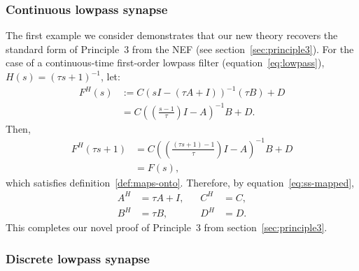 \subsubsection{Continuous lowpass synapse}

The first example we consider demonstrates that our new theory recovers the standard form of Principle~3 from the NEF (see section~\ref{sec:principle3}).
For the case of a continuous-time first-order lowpass filter (equation~\ref{eq:lowpass}), $H(s) = \left(\tau s + 1 \right)^{-1}$, let:
\begin{align*}
F^H(s) &:= C \left( sI - (\tau A + I) \right)^{-1} \left( \tau B \right) + D \\
&= C \left( \left(\frac{s-1}{\tau}\right)I - A \right)^{-1}B + D \text{.}
\end{align*}
Then, 
\begin{align*}
F^H \left( \tau s + 1 \right) &= C \left( \left(\frac{(\tau s + 1) - 1}{\tau}\right) I - A \right)^{-1}B + D \\
&= F(s)\text{,} 
\end{align*}
which satisfies definition~\ref{def:maps-onto}.
Therefore, by equation~\ref{eq:ss-mapped},
\begin{equation} \label{eq:p3-novel}
\begin{aligned}
A^H &= \tau A + I \text{,} & \quad C^H &= C \text{,} \\
B^H &= \tau B \text{,} & \quad D^H &= D \text{.}
\end{aligned}
\end{equation}
This completes our novel proof of Principle~3 from section~\ref{sec:principle3}.

\subsubsection{Discrete lowpass synapse}

